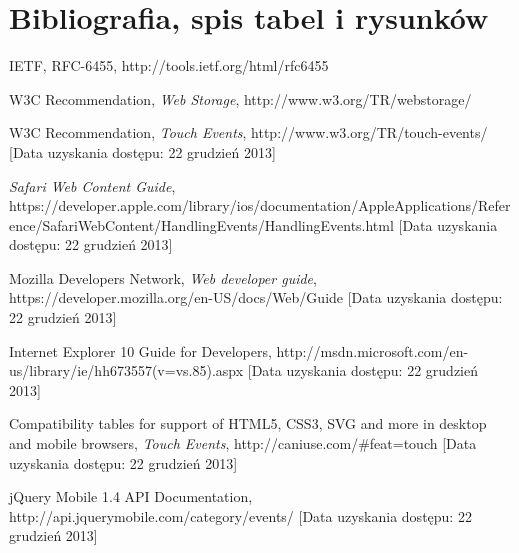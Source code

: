 \section{Bibliografia, spis tabel i rysunków}

\begin{thebibliography}{1}

   IETF, RFC-6455, http://tools.ietf.org/html/rfc6455
  
   W3C Recommendation, {\em Web Storage}, http://www.w3.org/TR/webstorage/
  
   W3C Recommendation, {\em Touch Events}, http://www.w3.org/TR/touch-events/ [Data uzyskania dostępu: 22 grudzień 2013]
  
   {\em Safari Web Content Guide}, https://developer.apple.com/library/ios/documentation/AppleApplications/Reference/SafariWebContent/HandlingEvents/HandlingEvents.html [Data uzyskania dostępu: 22 grudzień 2013]
  
   Mozilla Developers Network, {\em Web developer guide}, https://developer.mozilla.org/en-US/docs/Web/Guide [Data uzyskania dostępu: 22 grudzień 2013]
  
   Internet Explorer 10 Guide for Developers, http://msdn.microsoft.com/en-us/library/ie/hh673557(v=vs.85).aspx [Data uzyskania dostępu: 22 grudzień 2013]
  
   Compatibility tables for support of HTML5, CSS3, SVG and more in desktop and mobile browsers, {\em Touch Events}, http://caniuse.com/\#feat=touch [Data uzyskania dostępu: 22 grudzień 2013]
  
   jQuery Mobile 1.4 API Documentation, http://api.jquerymobile.com/category/events/ [Data uzyskania dostępu: 22 grudzień 2013]

\end{thebibliography}

\listoftables

\listoffigures
